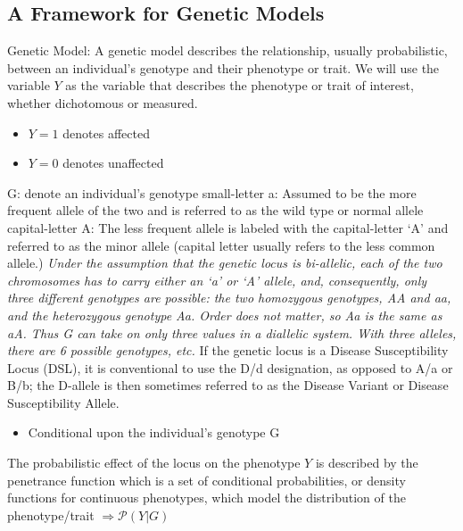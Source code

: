 \documentclass[a4paper,twoside,11pt]{article}
\begin{document}
\subsection{A Framework for Genetic Models}
\textcolor{NavyBlue}{Genetic Model: }A genetic model describes the relationship, usually probabilistic, between an individual’s genotype and their phenotype or trait.
\newline
We will use the variable $Y$ as the variable that describes the phenotype or trait of interest, whether dichotomous or measured.
\begin{itemize}
    \item $Y=1$ denotes affected
    \item $Y=0$ denotes unaffected
\end{itemize}
\textcolor{NavyBlue}{G: } denote an individual’s genotype
\newline
\newline
\textcolor{NavyBlue}{small-letter a: }Assumed to be the more frequent allele of the two and is referred to as the wild type or normal allele
\newline
\newline
\textcolor{NavyBlue}{capital-letter A: }The less frequent allele is labeled with the capital-letter ‘A’ and referred to as the minor allele (capital letter usually refers to the less common allele.)
\newline
\newline
\textcolor{NavyBlue}{\noindent \textit{Under the assumption that the genetic locus is bi-allelic, each of the two chromosomes has to carry either an ‘a’ or ‘A’ allele, and, consequently, only three different genotypes are possible: the two homozygous genotypes, AA and aa, and the heterozygous genotype Aa. Order does not matter, so Aa is the same as aA. Thus G can take on only three values in a diallelic system. With three alleles, there are 6 possible genotypes, etc. }}
\newline
\newline
If the genetic locus is a \textcolor{NavyBlue}{Disease Susceptibility Locus (DSL)}, it is conventional to use the D/d designation, as opposed to A/a or B/b; the D-allele is then sometimes referred to as the Disease Variant or Disease Susceptibility Allele.
\begin{itemize}
    \item Conditional upon the individual’s genotype G
\end{itemize}
The probabilistic effect of the locus on the phenotype $Y$ is described by the penetrance function which is a set of conditional probabilities, or density functions for continuous phenotypes, which model the distribution of the phenotype/trait $\Rightarrow \mathcal{P}(Y|G)$
\end{document}

